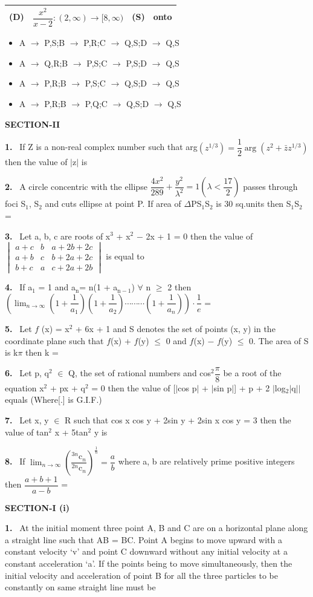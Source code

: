 \documentclass[10pt]{extarticle}
\newcommand{\papersec}[1]{\par\bigskip{\centering\Large\bfseries PAPER-#1\par}\medskip}
\newcommand{\partsec}[2]{\par\medskip\noindent{\large\bfseries PART-#1: #2}\par\smallskip}
\newcommand{\sect}[1]{\par\smallskip\noindent\textbf{#1}\par}
\newcommand{\qn}[1]{\par\smallskip\noindent\textbf{#1.}~}
\newenvironment{qoptions}{\begin{itemize}[leftmargin=1.8em,itemsep=1pt,topsep=2pt,label={}]}{\end{itemize}}
\newcommand{\opt}[2]{\item[(#1)] #2}
\begin{document}
\begin{multicols}{2}
{\begin{tabular}{|c|L{4.6cm}|c|L{1.4cm}|}
(D) & $\dfrac{x^2}{x-2}:(2,\infty)\rightarrow[8,\infty)$ & (S) & onto \\ \hline
\end{tabular}}\par
\begin{qoptions}
\opt{A}{A $\rightarrow$ P,S;B $\rightarrow$ P,R;C $\rightarrow$ Q,S;D $\rightarrow$ Q,S}
\opt{B}{A $\rightarrow$ Q,R;B $\rightarrow$ P,S;C $\rightarrow$ P,S;D $\rightarrow$ Q,S}
\opt{C}{A $\rightarrow$ P,R;B $\rightarrow$ P,S;C $\rightarrow$ Q,S;D $\rightarrow$ Q,S}
\opt{D}{A $\rightarrow$ P,R;B $\rightarrow$ P,Q;C $\rightarrow$ Q,S;D $\rightarrow$ Q,S}
\end{qoptions}
\sect{SECTION-II}
\qn{1} If Z is a non-real complex number such that arg$\left(z^{1/3}\right)=\dfrac12\arg\left(z^2+\bar zz^{1/3}\right)$ then the value of $|$z$|$ is
\qn{2} A circle concentric with the ellipse $\dfrac{4x^2}{289}+\dfrac{y^2}{\lambda^2}=1\left(\lambda<\dfrac{17}2\right)$ passes through foci S$_1$, S$_2$ and cuts ellipse at point P. If area of $\Delta$PS$_1$S$_2$ is 30 sq.units then S$_1$S$_2$ =
\qn{3} Let a, b, c are roots of x$^3$ + x$^2$ $-$ 2x + 1 = 0 then the value of $\begin{vmatrix}a+c&b&a+2b+2c\\a+b&c&b+2a+2c\\b+c&a&c+2a+2b\end{vmatrix}$ is equal to
\qn{4} If a$_1$ = 1 and a$_\mathrm n$= n(1 + a$_{\mathrm n-1}$) $\forall$ n $\ge$ 2 then $\left(\displaystyle\lim_{n\to\infty}\left(1+\dfrac1{a_1}\right)\left(1+\dfrac1{a_2}\right)\cdots\cdots\cdots\left(1+\dfrac1{a_n}\right)\right)\cdot\dfrac1e$ =
\qn{5} Let $f$ (x) = x$^2$ + 6x + 1 and S denotes the set of points (x, y) in the coordinate plane such that $f$(x) + $f$(y) $\le$ 0 and $f$(x) $-$ $f$(y) $\le$ 0. The area of S is k$\pi$ then k =
\qn{6} Let p, q$^2$ $\in$ Q, the set of rational numbers and cos$^2\dfrac\pi8$ be a root of the equation x$^2$ + px + q$^2$ = 0 then the value of [$|$cos p$|$ + $|$sin p$|$] + p + 2 $|$log$_2|$q$||$ equals (Where[.] is G.I.F.)
\qn{7} Let x, y $\in$ R such that cos x cos y + 2sin y + 2sin x cos y = 3 then the value of tan$^2$ x + 5tan$^2$ y is
\qn{8} If $\displaystyle\lim_{n\to\infty}\left(\dfrac{{}^{3n}\mathrm c_n}{{}^{2n}\mathrm c_n}\right)^{\frac1n}=\dfrac ab$ where a, b are relatively prime positive integers then $\dfrac{a+b+1}{a-b}$ =
\raggedcolumns
\papersec{2}
\partsec{1}{PHYSICS}
\sect{SECTION-I (i)}
\qn{1} At the initial moment three point A, B and C are on a horizontal plane along a straight line such that AB = BC. Point A begins to move upward with a constant velocity `v' and point C downward without any initial velocity at a constant acceleration `a'. If the points being to move simultaneously, then the initial velocity and acceleration of point B for all the three particles to be constantly on same straight line must be

\end{multicols}
\end{document}
